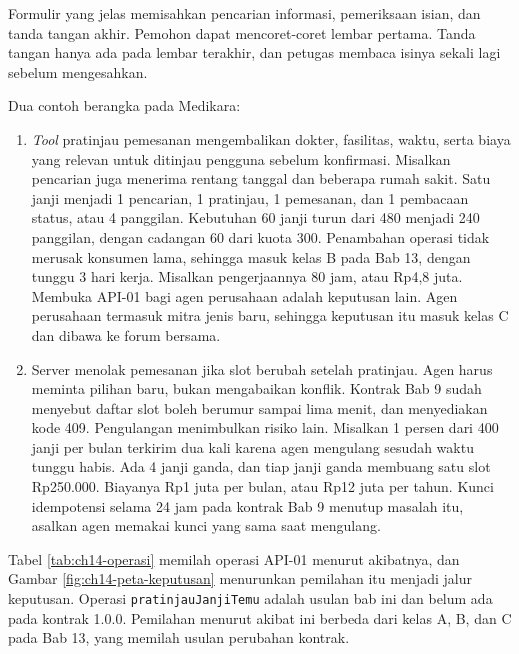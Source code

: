 Formulir yang jelas memisahkan pencarian informasi, pemeriksaan isian, dan tanda tangan akhir. Pemohon dapat mencoret-coret lembar pertama. Tanda tangan hanya ada pada
lembar terakhir, dan petugas membaca isinya sekali lagi sebelum mengesahkan.

Dua contoh berangka pada Medikara:
\begin{enumerate}
  \item \textit{Tool} pratinjau pemesanan mengembalikan dokter, fasilitas, waktu, serta biaya yang relevan untuk ditinjau pengguna sebelum konfirmasi. Misalkan pencarian juga menerima
        rentang tanggal dan beberapa rumah sakit. Satu janji menjadi 1 pencarian, 1 pratinjau, 1 pemesanan, dan 1 pembacaan status, atau 4 panggilan. Kebutuhan 60 janji turun
        dari 480 menjadi 240 panggilan, dengan cadangan 60 dari kuota 300. Penambahan operasi tidak merusak konsumen lama, sehingga masuk kelas B pada Bab 13, dengan tunggu 3
        hari kerja. Misalkan pengerjaannya 80 jam, atau Rp4,8 juta. Membuka API-01 bagi agen perusahaan adalah keputusan lain. Agen perusahaan termasuk mitra jenis baru, sehingga
        keputusan itu masuk kelas C dan dibawa ke forum bersama.
  \item Server menolak pemesanan jika slot berubah setelah pratinjau. Agen harus meminta pilihan baru, bukan mengabaikan konflik. Kontrak Bab 9 sudah menyebut daftar slot boleh
        berumur sampai lima menit, dan menyediakan kode 409. Pengulangan menimbulkan risiko lain. Misalkan 1 persen dari 400 janji per bulan terkirim dua kali karena agen mengulang
        sesudah waktu tunggu habis. Ada 4 janji ganda, dan tiap janji ganda membuang satu slot Rp250.000. Biayanya Rp1 juta per bulan, atau Rp12 juta per tahun. Kunci idempotensi
        selama 24 jam pada kontrak Bab 9 menutup masalah itu, asalkan agen memakai kunci yang sama saat mengulang.
\end{enumerate}

Tabel \ref{tab:ch14-operasi} memilah operasi API-01 menurut akibatnya, dan Gambar \ref{fig:ch14-peta-keputusan} menurunkan pemilahan itu menjadi jalur keputusan. Operasi
\texttt{pratinjauJanjiTemu} adalah usulan bab ini dan belum ada pada kontrak 1.0.0. Pemilahan menurut akibat ini berbeda dari kelas A, B, dan C pada Bab 13, yang memilah
usulan perubahan kontrak.


